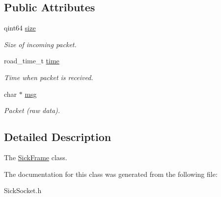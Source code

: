 \subsection*{Public Attributes}
\begin{DoxyCompactItemize}
\item 
\hypertarget{classpacpus_1_1SickFrame_a80b987f69b595a40effddea23d620224}{qint64 \hyperlink{classpacpus_1_1SickFrame_a80b987f69b595a40effddea23d620224}{size}}\label{classpacpus_1_1SickFrame_a80b987f69b595a40effddea23d620224}

\begin{DoxyCompactList}\small\item\em Size of incoming packet. \end{DoxyCompactList}\item 
\hypertarget{classpacpus_1_1SickFrame_af0ed21fe9690c564356838543a3b0126}{road\-\_\-time\-\_\-t \hyperlink{classpacpus_1_1SickFrame_af0ed21fe9690c564356838543a3b0126}{time}}\label{classpacpus_1_1SickFrame_af0ed21fe9690c564356838543a3b0126}

\begin{DoxyCompactList}\small\item\em Time when packet is received. \end{DoxyCompactList}\item 
\hypertarget{classpacpus_1_1SickFrame_aeaaccfb07a72aae9306c16c5574950ca}{char $\ast$ \hyperlink{classpacpus_1_1SickFrame_aeaaccfb07a72aae9306c16c5574950ca}{msg}}\label{classpacpus_1_1SickFrame_aeaaccfb07a72aae9306c16c5574950ca}

\begin{DoxyCompactList}\small\item\em Packet (raw data). \end{DoxyCompactList}\end{DoxyCompactItemize}


\subsection{Detailed Description}
The \hyperlink{classpacpus_1_1SickFrame}{Sick\-Frame} class. 

The documentation for this class was generated from the following file\-:\begin{DoxyCompactItemize}
\item 
Sick\-Socket.\-h\end{DoxyCompactItemize}
